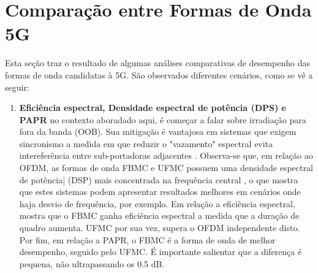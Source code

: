 \section{Comparação entre Formas de Onda 5G}

Esta seção traz o resultado de algumas análises comparativas de desempenho das formas de onda candidatas à 5G. São observados diferentes cenários, como se vê a seguir: 

\begin{enumerate} 
\item \textbf{Eficiência espectral, Densidade espectral de potência (DPS) e PAPR} \label{irradiação} no contexto aboradado aqui, é começar a falar sobre irradiação para fora da banda (OOB). Sua mitigação é vantajosa em sistemas que exigem sincronismo a medida em que reduzir o "vazamento" espectral evita intereferência entre sub-portadoras adjacentes \cite{YinshengLiu}. Observa-se que, em relação ao OFDM, as formas de onda FBMC e UFMC possuem uma densidade espectral de potência| (DSP) mais concentrada na frequência central \cite{YinshengLiu}, o que mostra que estes sistemas podem apresentar resultados melhores em cenários onde haja desvio de frequência, por exemplo. Em relação a eficiência espectral, \cite{Gerzaguet} mostra que o FBMC ganha eficiência espectral a medida que a duração de quadro aumenta. UFMC por sua vez, supera o OFDM independente disto. Por fim, em relação a PAPR, o FBMC é a forma de onda de melhor desempenho, seguido pelo UFMC. É importante salientar que a diferença é pequena, não ultrapassando os 0.5 dB. \cite{Gerzaguet} 


\end{enumerate}

